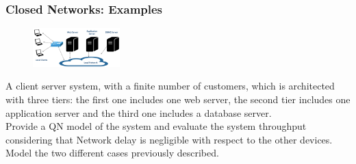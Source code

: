 \documentclass[10pt, oneside]{article}
\begin{document}
\subsubsection*{ 
    Closed Networks: Examples}\begin{figure}[H]
        \begin{center}
            \includegraphics[width=0.3\textwidth]{img/img109.png}
            \end{center}
        \end{figure}A client server system, with a finite number of customers, which is architected with three tiers: the first one includes one web server, the second tier includes one application server and the third one includes a database server.\\
        Provide a QN model of the system and evaluate the system throughput considering that Network delay is negligible with respect to the other devices. Model the two different cases previously described.

 
 

\end{document}
